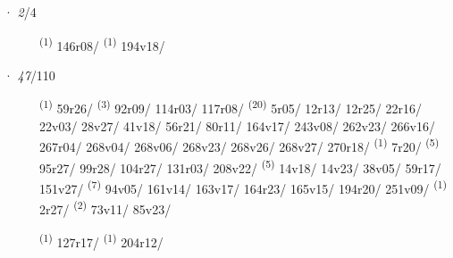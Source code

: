 \ENTRYEND
\noindent{} · \textit{2}/4 \LEMMALINE
\begin{description}
    \item[]  \textsuperscript{(1)} \mbox{146r08/} \CASEBREAK {} \textsuperscript{(1)} \mbox{194v18/}
\end{description}
\ENTRYEND
\noindent{} · \textit{47}/110 \LEMMALINE
\begin{description}
    \item[]  \textsuperscript{(1)} \mbox{59r26/} \textsuperscript{(3)} \mbox{92r09/} \mbox{114r03/} \mbox{117r08/} \CASEBREAK {} \textsuperscript{(20)} \mbox{5r05/} \mbox{12r13/} \mbox{12r25/} \mbox{22r16/} \mbox{22v03/} \mbox{28v27/} \mbox{41v18/} \mbox{56r21/} \mbox{80r11/} \mbox{164v17/} \mbox{243v08/} \mbox{262v23/} \mbox{266v16/} \mbox{267r04/} \mbox{268v04/} \mbox{268v06/} \mbox{268v23/} \mbox{268v26/} \mbox{268v27/} \mbox{270r18/} \textsuperscript{(1)} \mbox{7r20/} \textsuperscript{(5)} \mbox{95r27/} \mbox{99r28/} \mbox{104r27/} \mbox{131r03/} \mbox{208v22/} \CASEBREAK {} \textsuperscript{(5)} \mbox{14v18/} \mbox{14v23/} \mbox{38v05/} \mbox{59r17/} \mbox{151v27/} \textsuperscript{(7)} \mbox{94v05/} \mbox{161v14/} \mbox{163v17/} \mbox{164r23/} \mbox{165v15/} \mbox{194r20/} \mbox{251v09/} \CASEBREAK {} \textsuperscript{(1)} \mbox{2r27/} \textsuperscript{(2)} \mbox{73v11/} \mbox{85v23/}
    \item[]  \textsuperscript{(1)} \mbox{127r17/} \CASEBREAK {} \textsuperscript{(1)} \mbox{204r12/}
\end{description}
